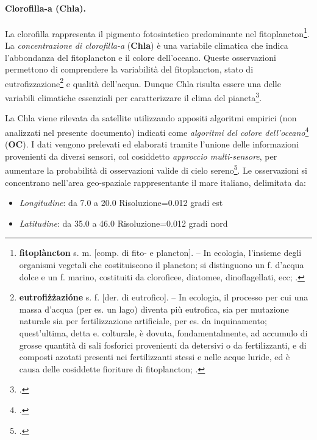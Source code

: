 \documentclass[./main.tex]{subfiles}
\begin{document}
\paragraph{Clorofilla-a (Chla).}
La clorofilla rappresenta il pigmento fotosintetico predominante nel fitoplancton\footnote{\textbf{fitoplàncton} s. m. [comp. di fito- e plancton]. – In ecologia, l’insieme degli organismi vegetali che costituiscono il plancton; si distinguono un f. d’acqua dolce e un f. marino, costituiti da cloroficee, diatomee, dinoflagellati, ecc; \cite{treccani-fitoplancton}.
}. La \textit{concentrazione di clorofilla-a} (\textbf{Chla}) è una variabile climatica che  indica l'abbondanza del fitoplancton e il colore dell'oceano. Queste osservazioni permettono di comprendere la variabilità del fitoplancton, stato di eutrofizzazione\footnote{\textbf{eutrofiżżazióne} s. f. [der. di eutrofico]. – In ecologia, il processo per cui una massa d’acqua (per es. un lago) diventa più eutrofica, sia per mutazione naturale sia per fertilizzazione artificiale, per es. da inquinamento; quest'ultima, detta e. colturale, è dovuta, fondamentalmente, ad accumulo di grosse quantità di sali fosforici provenienti da detersivi o da fertilizzanti, e di composti azotati presenti nei fertilizzanti stessi e nelle acque luride, ed è causa delle cosiddette fioriture di fitoplancton; \cite{treccani-eutrofizzazione}.
} e qualità dell'acqua. Dunque Chla risulta essere una delle variabili climatiche essenziali per caratterizzare il clima del pianeta\footcite{MERDER2024198}.

La Chla viene rilevata da satellite utilizzando appositi algoritmi empirici (non analizzati nel presente documento) indicati come \textit{algoritmi del colore dell'oceano}\footcite{dierssen2010perspectives} (\textbf{OC}). I dati vengono prelevati ed elaborati tramite l'unione delle informazioni provenienti da diversi sensori, col cosiddetto \textit{approccio multi-sensore}, per aumentare la probabilità di osservazioni valide di cielo sereno\footcite[129-132]{os-15-127-2019}. Le osservazioni si concentrano nell'area geo-spaziale rappresentante il mare italiano, delimitata da:
\begin{itemize}
    \item \textit{Longitudine}: da 7.0 a 20.0 Risoluzione=0.012 gradi est
    \item \textit{Latitudine}: da 35.0 a 46.0 Risoluzione=0.012 gradi nord 
\end{itemize}
\end{document}
